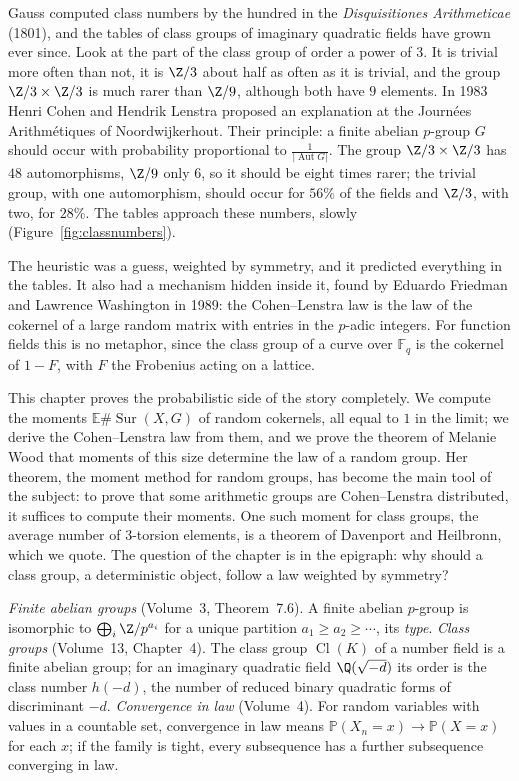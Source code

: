 Gauss computed class numbers by the hundred in the \emph{Disquisitiones Arithmeticae} (1801), and the tables of class groups of imaginary quadratic fields have grown ever since. Look at the part of the class group of order a power of $3$. It is trivial more often than not, it is $\Z/3$ about half as often as it is trivial, and the group $\Z/3\times\Z/3$ is much rarer than $\Z/9$, although both have $9$ elements. In 1983 Henri Cohen and Hendrik Lenstra proposed an explanation at the Journées Arithmétiques of Noordwijkerhout. Their principle: a finite abelian $p$-group $G$ should occur with probability proportional to $\frac1{|\operatorname{Aut}G|}$. The group $\Z/3\times\Z/3$ has $48$ automorphisms, $\Z/9$ only $6$, so it should be eight times rarer; the trivial group, with one automorphism, should occur for $56\%$ of the fields and $\Z/3$, with two, for $28\%$. The tables approach these numbers, slowly (Figure~\ref{fig:classnumbers}).

The heuristic was a guess, weighted by symmetry, and it predicted everything in the tables. It also had a mechanism hidden inside it, found by Eduardo Friedman and Lawrence Washington in 1989: the Cohen--Lenstra law is the law of the cokernel of a large random matrix with entries in the $p$-adic integers. For function fields this is no metaphor, since the class group of a curve over $\mathbb F_q$ is the cokernel of $1-F$, with $F$ the Frobenius acting on a lattice.

This chapter proves the probabilistic side of the story completely. We compute the moments $\mathbb E\#\operatorname{Sur}(X,G)$ of random cokernels, all equal to $1$ in the limit; we derive the Cohen--Lenstra law from them, and we prove the theorem of Melanie Wood that moments of this size determine the law of a random group. Her theorem, the moment method for random groups, has become the main tool of the subject: to prove that some arithmetic groups are Cohen--Lenstra distributed, it suffices to compute their moments. One such moment for class groups, the average number of $3$-torsion elements, is a theorem of Davenport and Heilbronn, which we quote. The question of the chapter is in the epigraph: why should a class group, a deterministic object, follow a law weighted by symmetry?

\begin{reminder}
\emph{Finite abelian groups} (Volume~3, Theorem~7.6). A finite abelian $p$-group is isomorphic to $\bigoplus_i\Z/p^{a_i}$ for a unique partition $a_1\ge a_2\ge\cdots$, its \emph{type}.
\emph{Class groups} (Volume~13, Chapter~4). The class group $\operatorname{Cl}(K)$ of a number field is a finite abelian group; for an imaginary quadratic field $\Q(\sqrt{-d})$ its order is the class number $h(-d)$, the number of reduced binary quadratic forms of discriminant $-d$.
\emph{Convergence in law} (Volume~4). For random variables with values in a countable set, convergence in law means $\mathbb P(X_n=x)\to\mathbb P(X=x)$ for each $x$; if the family is tight, every subsequence has a further subsequence converging in law.
\end{reminder}

